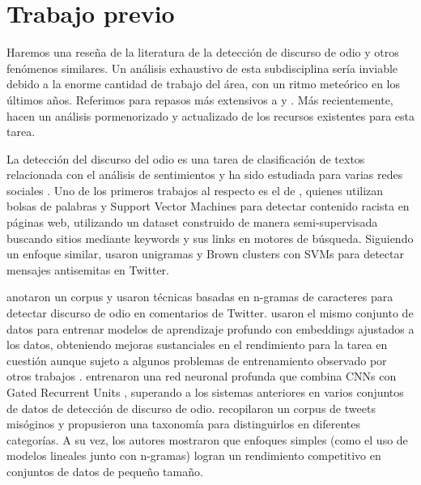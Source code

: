 

\section{Trabajo previo}
\label{sec:hate_speech_previous_work}

Haremos una reseña de la literatura de la detección de discurso de odio y otros fenómenos similares. Un análisis exhaustivo de esta subdisciplina sería inviable debido a la enorme cantidad de trabajo del área, con un ritmo meteórico en los últimos años. Referimos para repasos más extensivos a \citet{schmidt2017survey} y \citet{fortuna2018survey}. Más recientemente, \citet{poletto2021resources} hacen un análisis pormenorizado y actualizado de los recursos existentes para esta tarea.

La detección del discurso del odio es una tarea de clasificación de textos relacionada con el análisis de sentimientos y ha sido estudiada para varias redes sociales \cite{thelwall2008social, pak2010twitter, saleem2017web}. Uno de los primeros trabajos al respecto es el de \citet{greevy2004classifying}, quienes utilizan bolsas de palabras y Support Vector Machines para detectar contenido racista en páginas web, utilizando un dataset construido de manera semi-supervisada buscando sitios mediante keywords y sus links en motores de búsqueda. Siguiendo un enfoque similar, \citet{warner2012detecting} usaron unigramas y Brown clusters \cite{brown1992class} con SVMs para detectar mensajes antisemitas en Twitter.

\citet{waseem2016hateful} anotaron un corpus y usaron técnicas basadas en n-gramas de caracteres para detectar discurso de odio en comentarios de Twitter. \citet{badjatiya2017deep} usaron el mismo conjunto de datos para entrenar modelos de aprendizaje profundo con embeddings ajustados a los datos, obteniendo mejoras sustanciales en el rendimiento para la tarea en cuestión aunque sujeto a algunos problemas de entrenamiento observado por otros trabajos \cite{arango2019hate}. \citet{zhang2018detecting} entrenaron una red neuronal profunda que combina CNNs con Gated Recurrent Units \cite{cho2014learning}, superando a los sistemas anteriores en varios conjuntos de datos de detección de discurso de odio. \citet{anzovino2018automatic} recopilaron un corpus de tweets misóginos y propusieron una taxonomía para distinguirlos en diferentes categorías. A su vez, los autores mostraron que enfoques simples (como el uso de modelos lineales junto con n-gramas) logran un rendimiento competitivo en conjuntos de datos de pequeño tamaño.

